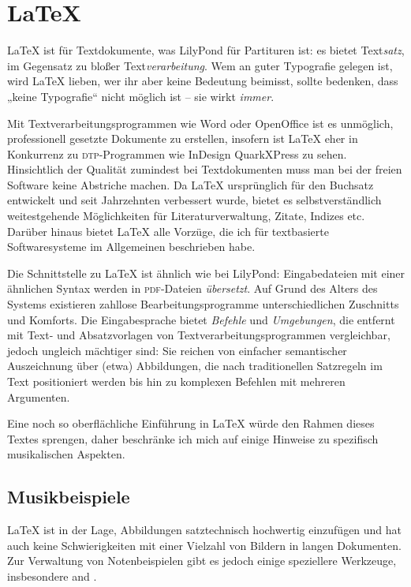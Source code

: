 \documentclass[DIV=12]{scrreprt}
\begin{document}
\chapter{\LaTeX}
\label{chap:pt_latex}

\LaTeX{} ist für Textdokumente, was LilyPond für Partituren ist:
es bietet Text\emph{satz}, im Gegensatz zu bloßer Text\emph{verarbeitung}.
Wem an guter Typografie gelegen ist, wird \LaTeX{} lieben, wer ihr aber keine Bedeutung beimisst, sollte bedenken, dass „keine Typografie“ nicht möglich ist -- sie wirkt \emph{immer}. 

Mit Textverarbeitungsprogrammen wie Word oder OpenOffice ist es unmöglich, professionell gesetzte Dokumente zu erstellen, insofern ist \LaTeX{} eher in Konkurrenz zu \textsc{dtp}-Programmen wie InDesign QuarkXPress zu sehen.
Hinsichtlich der Qualität zumindest bei Textdokumenten muss man bei der freien Software keine Abstriche machen.
Da \LaTeX{} ursprünglich für den Buchsatz entwickelt und seit Jahrzehnten verbessert wurde, bietet es selbstverständlich weitestgehende Möglichkeiten für Literaturverwaltung, Zitate, Indizes etc.
Darüber hinaus bietet \LaTeX{} alle Vorzüge, die ich für textbasierte Softwaresysteme im Allgemeinen  beschrieben habe.

Die Schnittstelle zu \LaTeX{} ist ähnlich wie bei LilyPond:
Eingabedateien mit einer ähnlichen Syntax werden in \textsc{pdf}-Dateien \emph{übersetzt}.
Auf Grund des Alters des Systems existieren zahllose Bearbeitungsprogramme unterschiedlichen Zuschnitts und Komforts.
Die Eingabesprache bietet \emph{Befehle} und \emph{Umgebungen}, die entfernt mit Text- und Absatzvorlagen von Textverarbeitungsprogrammen vergleichbar, jedoch ungleich mächtiger sind:
Sie reichen von einfacher semantischer Auszeichnung über (etwa) Abbildungen, die nach traditionellen Satzregeln im Text positioniert werden bis hin zu komplexen Befehlen mit mehreren Argumenten.

Eine noch so oberflächliche Einführung in \LaTeX{} würde den Rahmen dieses Textes sprengen, daher beschränke ich mich auf einige Hinweise zu spezifisch musikalischen Aspekten.


\section{Musikbeispiele}
\label{sec:pt_music-examples}

\LaTeX{} ist in der Lage, Abbildungen satztechnisch hochwertig einzufügen und hat auch keine Schwierigkeiten mit einer Vielzahl von Bildern in langen Dokumenten.
Zur Verwaltung von Notenbeispielen gibt es jedoch einige speziellere Werkzeuge, insbesondere  and .
\end{document}
